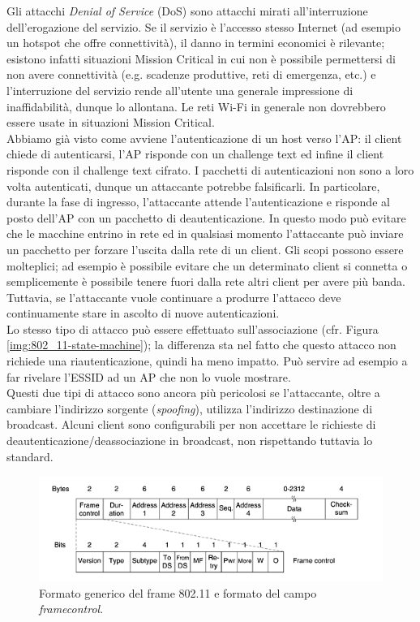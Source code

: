 Gli attacchi \textit{Denial of Service} (DoS) sono attacchi mirati all'interruzione dell'erogazione del servizio. Se il servizio è l'accesso stesso Internet (ad esempio un hotspot che offre connettività), il danno in termini economici è rilevante; esistono infatti situazioni Mission Critical in cui non è possibile permettersi di non avere connettività (e.g. scadenze produttive, reti di emergenza, etc.) e l'interruzione del servizio rende all'utente una generale impressione di inaffidabilità, dunque lo allontana. Le reti Wi-Fi in generale non dovrebbero essere usate in situazioni Mission Critical.\\
Abbiamo già visto come avviene l'autenticazione di un host verso l'AP: il client chiede di autenticarsi, l'AP risponde con un challenge text ed infine il client risponde con il challenge text cifrato. I pacchetti di autenticazioni non sono a loro volta autenticati, dunque un attaccante potrebbe falsificarli. In particolare, durante la fase di ingresso, l'attaccante attende l'autenticazione e risponde al posto dell'AP con un pacchetto di deautenticazione. In questo modo può evitare che le macchine entrino in rete ed in qualsiasi momento l'attaccante può inviare un pacchetto per forzare l'uscita dalla rete di un client. Gli scopi possono essere molteplici; ad esempio è possibile evitare che un determinato client si connetta o semplicemente è possibile tenere fuori dalla rete altri client per avere più banda. Tuttavia, se l'attaccante vuole continuare a produrre l'attacco deve continuamente stare in ascolto di nuove autenticazioni.\\
Lo stesso tipo di attacco può essere effettuato sull'associazione (cfr. Figura \ref{img:802_11-state-machine}); la differenza sta nel fatto che questo attacco non richiede una riautenticazione, quindi ha meno impatto. Può servire ad esempio a far rivelare l'ESSID ad un AP che non lo vuole mostrare.\\
Questi due tipi di attacco sono ancora più pericolosi se l'attaccante, oltre a cambiare l'indirizzo sorgente (\textit{spoofing}), utilizza l'indirizzo destinazione di broadcast. Alcuni client sono configurabili per non accettare le richieste di deautenticazione/deassociazione in broadcast, non rispettando tuttavia lo standard.
\begin{figure}[htbp]
	\centering
	\includegraphics[scale = 0.8]{images/802_11-frame}
	\caption{Formato generico del frame 802.11 e formato del campo \textit{framecontrol}.}
	\label{img:802_11-frame}
\end{figure}\\
